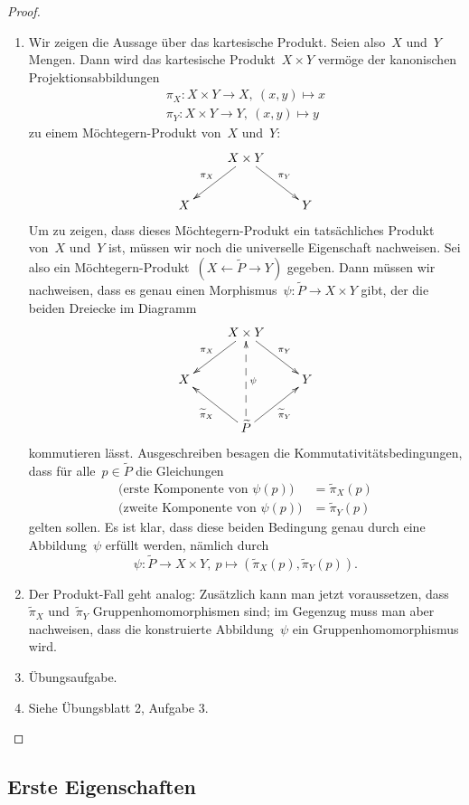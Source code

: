 \documentclass[a4paper,ngerman]{scrartcl}
\theoremstyle{definition}
\theoremstyle{plain}
\theoremstyle{remark}
\begin{document}
\begin{proof}
\begin{enumerate}
\item Wir zeigen die Aussage über das kartesische Produkt. Seien also~$X$
und~$Y$ Mengen. Dann wird das kartesische Produkt~$X \times Y$ vermöge der
kanonischen Projektionsabbildungen
\begin{align*}
  \pi_X : X \times Y \to X,\ (x,y) \mapsto x \\
  \pi_Y : X \times Y \to Y,\ (x,y) \mapsto y
\end{align*}
zu einem Möchtegern-Produkt von~$X$ und~$Y$:
\[ \xymatrix{
  & X \times Y \ar[ld]_{\pi_X} \ar[rd]^{\pi_Y} \\
  X & & Y
} \]
Um zu zeigen, dass dieses Möchtegern-Produkt ein tatsächliches Produkt von~$X$
und~$Y$ ist, müssen wir noch die universelle Eigenschaft nachweisen. Sei also
ein Möchtegern-Produkt~$(X \leftarrow \widetilde P \to Y)$ gegeben. Dann müssen
wir nachweisen, dass es genau einen Morphismus~$\psi:\widetilde P \to X \times
Y$ gibt, der die beiden Dreiecke im Diagramm
\[ \xymatrix{
    & X \times Y \ar[ld]_{\pi_X} \ar[rd]^{\pi_Y} \\
  X & & Y \\
    & \widetilde P \ar[lu]^{\widetilde \pi_X} \ar@{-->}[uu]_\psi \ar[ru]_{\widetilde \pi_Y}
  } \]
kommutieren lässt. Ausgeschreiben besagen die Kommutativitätsbedingungen, dass
für alle~$p \in \widetilde P$ die Gleichungen
\begin{align*}
  \text{(erste Komponente von $\psi(p)$)} &= \widetilde \pi_X(p) \\
  \text{(zweite Komponente von $\psi(p)$)} &= \widetilde \pi_Y(p)
\end{align*}
gelten sollen.
Es ist klar, dass diese beiden Bedingung genau durch eine Abbildung~$\psi$
erfüllt werden, nämlich durch
\[ \psi : \widetilde P \to X \times Y,\ p \mapsto (\widetilde \pi_X(p),
\widetilde \pi_Y(p)). \]
\item Der Produkt-Fall geht analog: Zusätzlich kann man jetzt voraussetzen,
dass~$\widetilde \pi_X$ und~$\widetilde \pi_Y$ Gruppenhomomorphismen sind; im
Gegenzug muss man aber nachweisen, dass die konstruierte Abbildung~$\psi$ ein
Gruppenhomomorphismus wird.
\item Übungsaufgabe.
\item Siehe Übungsblatt 2, Aufgabe 3. \qedhere
\end{enumerate}
\end{proof}


\subsection{Erste Eigenschaften}
\end{document}
